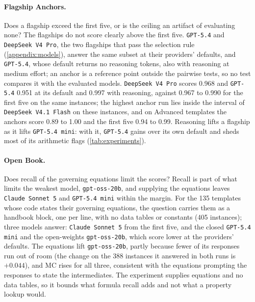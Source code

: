 \paragraph{Flagship Anchors.} Does a flagship exceed the first five, or is the ceiling an artifact
of evaluating none?
The flagships do not score clearly above the first five.
\texttt{GPT-5.4} and \texttt{DeepSeek V4 Pro}, the two flagships that pass the selection rule
(\autoref{appendix:models}), answer the same subset at their providers' defaults, and
\texttt{GPT-5.4}, whose default returns no reasoning tokens, also with reasoning at medium effort;
an anchor is a reference point outside the pairwise tests, so no test compares it with the
evaluated models.
\texttt{DeepSeek V4 Pro} scores 0.968 and \texttt{GPT-5.4} 0.951 at its default and 0.997 with
reasoning, against 0.967 to 0.990 for the first five on the same instances; the highest anchor
run lies inside the interval of \texttt{DeepSeek V4.1 Flash} on these instances, and on Advanced
templates the anchors score 0.89 to 1.00 and the first five 0.94 to 0.99.
Reasoning lifts a flagship as it lifts \texttt{GPT-5.4 mini}: with it, \texttt{GPT-5.4} gains over
its own default and sheds most of its arithmetic flags (\autoref{tab:experiments}).

\paragraph{Open Book.} Does recall of the governing equations limit the scores?
Recall is part of what limits the weakest model, \texttt{gpt-oss-20b}, and supplying the equations
leaves \texttt{Claude Sonnet 5} and \texttt{GPT-5.4 mini} within the margin.
For the 135 templates whose code states their governing equations, the question carries them as a
handbook block, one per line, with no data tables or constants (405 instances); three models
answer: \texttt{Claude Sonnet 5} from the first five, and the closed \texttt{GPT-5.4 mini} and the
open-weights \texttt{gpt-oss-20b}, which score lower at the providers' defaults.
The equations lift \texttt{gpt-oss-20b}, partly because fewer of its responses run out of room (the
change on the 388 instances it answered in both runs is $+0.044$), and MC rises for all three,
consistent with the equations prompting the responses to state the intermediates.
The experiment supplies equations and no data tables, so it bounds what formula recall adds and not
what a property lookup would.

